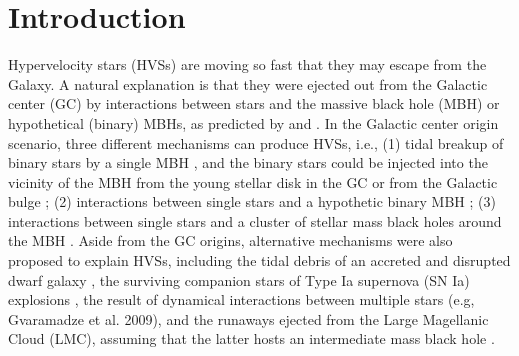 \documentclass[iop, aj]{emulateapj}
\begin{document}
\section{Introduction}

Hypervelocity stars (HVSs) are moving so fast that they may escape from the Galaxy. A natural explanation is that they were ejected out from the Galactic center (GC)
by interactions between stars and the massive black hole (MBH) or hypothetical (binary) MBHs, as predicted by \cite{1988Natur.331..687H} and \cite{2003ApJ...599.1129Y}.
In the Galactic center origin scenario, three different mechanisms can produce HVSs, i.e., (1) tidal breakup of binary stars by a single MBH
\citep{1988Natur.331..687H, 2003ApJ...599.1129Y, 2006ApJ...653.1194B}, and the binary stars could be injected into the vicinity of the MBH from the young stellar disk in the GC
\citep[e.g., ][]{2010ApJ...709.1356L, 2010ApJ...722.1744Z, 2013ApJ...768..153Z} or from the Galactic bulge \citep{2009ApJ...690..795P, 2009ApJ...698.1330P}; (2) interactions between single stars and a hypothetic binary MBH \citep{2003ApJ...599.1129Y, 2006ApJ...651..392S, 2007MNRAS.379L..45S, 2006ApJ...648..976M}; (3) interactions between single stars and a cluster of stellar mass black holes around the MBH \citep{2008MNRAS.383...86O}. Aside from the GC origins, alternative mechanisms were also proposed to explain HVSs, including the tidal debris of an accreted and disrupted dwarf galaxy \citep{2009ApJ...691L..63A, 2009ApJ...707L..22T}, the surviving companion stars of Type Ia supernova (SN Ia) explosions \citep{2009A&A...508L..27W}, the result of dynamical interactions between multiple stars (e.g, Gvaramadze et al. 2009), and the runaways ejected from the Large Magellanic Cloud (LMC), assuming that the latter hosts an intermediate mass black hole \citep{2016ApJ...825L...6B, 2017MNRAS.469.2151B}.
\end{document}

